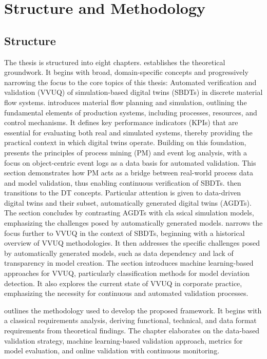 \section{Structure and Methodology}

\subsection*{Structure}
The thesis is structured into eight chapters.
 establishes the theoretical groundwork. It begins with broad, domain-specific concepts and progressively narrowing the focus to the core topics of this thesis: Automated verification and validation (VVUQ) of simulation-based digital twins (SBDTs) in discrete material flow systems.
 introduces material flow planning and simulation, outlining the fundamental elements of production systems, including processes, resources, and control mechanisms. It defines key performance indicators (KPIs) that are essential for evaluating both real and simulated systems, thereby providing the practical context in which digital twins operate.
Building on this foundation,  presents the principles of process mining (PM) and event log analysis, with a focus on object-centric event logs as a data basis for automated validation. This section demonstrates how PM acts as a bridge between real-world process data and model validation, thus enabling continuous verification of SBDTs.
 then transitions to the DT concepts. Particular attention is given to data-driven digital twins and their subset, automatically generated digital twins (AGDTs). The section concludes by contrasting AGDTs with cla  ssical simulation models, emphasizing the challenges posed by automatically generated models.
 narrows the focus further to VVUQ in the context of SBDTs, beginning with a historical overview of VVUQ methodologies. It then addresses the specific challenges posed by automatically generated models, such as data dependency and lack of transparency in model creation. The section introduces machine learning-based approaches for VVUQ, particularly classification methods for model deviation detection. It also explores the current state of VVUQ in corporate practice, emphasizing the necessity for continuous and automated validation processes.

 outlines the methodology used to develop the proposed framework. It begins with a classical requirements analysis, deriving functional, technical, and data format requirements from theoretical findings. The chapter elaborates on the data-based validation strategy, machine learning-based validation approach, metrics for model evaluation, and online validation with continuous monitoring.

